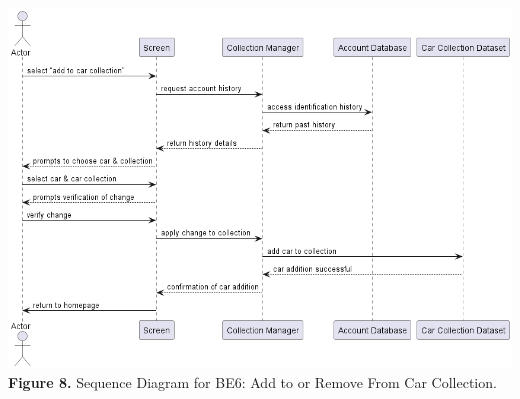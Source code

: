 \documentclass[]{article}
\begin{document}
\begin{center}
	\includegraphics[scale=0.55]{Sequence Diagrams/BE6_Sequence_Diagram.png}\\
	\textbf{Figure 8.} Sequence Diagram for BE6: Add to or Remove From Car Collection.\\
\end{center}
\end{document}
